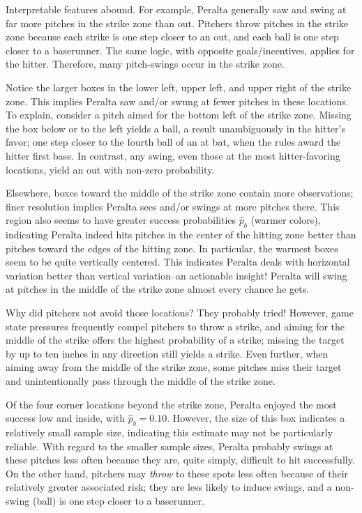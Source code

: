 Interpretable features abound. For example, Peralta generally saw and swing at far more pitches in the strike zone than out. Pitchers throw pitches in the strike zone because each strike is one step closer to an out, and each ball is one step closer to a baserunner. The same logic, with opposite goals/incentives, applies for the hitter. Therefore, many pitch-swings occur in the strike zone.

Notice the larger boxes in the lower left, upper left, and upper right of the strike zone. This implies Peralta saw and/or swung at fewer pitches in these locations. To explain, consider a pitch aimed for the bottom left of the strike zone. Missing the box below or to the left yields a ball, a result unambiguously in the hitter's favor; one step closer to the fourth ball of an at bat, when the rules award the hitter first base. In contrast, any swing, even those at the most hitter-favoring locations, yield an out with non-zero probability.

Elsewhere, boxes toward the middle of the strike zone contain more observations; finer resolution implies Peralta sees and/or swings at more pitches there. This region also seems to have greater success probabilities $\hat{p}_{b}$ (warmer colors), indicating Peralta indeed hits pitches in the center of the hitting zone better than pitches toward the edges of the hitting zone. In particular, the warmest boxes seem to be quite vertically centered. This indicates Peralta deals with horizontal variation better than vertical variation--an actionable insight! Peralta will swing at pitches in the middle of the strike zone almost every chance he gets.

Why did pitchers not avoid those locations? They probably tried! However, game state pressures frequently compel pitchers to throw a strike, and aiming for the middle of the strike offers the highest probability of a strike; missing the target by up to ten inches in any direction still yields a strike. Even further, when aiming away from the middle of the strike zone, some pitches miss their target and unintentionally pass through the middle of the strike zone. 

Of the four corner locations beyond the strike zone, Peralta enjoyed the most success low and inside, with $\hat{p}_{b} = 0.10$. However, the size of this box indicates a relatively small sample size, indicating this estimate may not be particularly reliable. With regard to the smaller sample sizes, Peralta probably swings at these pitches less often because they are, quite simply, difficult to hit successfully. On the other hand, pitchers may {\it throw} to these spots less often because of their relatively greater associated risk; they are less likely to induce swings, and a non-swing (ball) is one step closer to a baserunner. 


